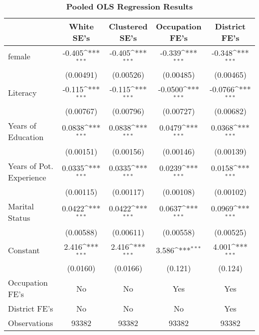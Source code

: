 \begin{table}[!htbp]\centering
\def\sym#1{\ifmmode^{#1}\else\(^{#1}\)\fi}
\caption{\textbf{Pooled OLS Regression Results}}
\small\begin{tabular}{@{\hskip\tabcolsep\extracolsep\fill}l*{4}{c}}
\toprule
                &\multicolumn{1}{c}{\textbf{White SE's}}&\multicolumn{1}{c}{\textbf{Clustered SE's}}&\multicolumn{1}{c}{\textbf{Occupation FE's}}&\multicolumn{1}{c}{\textbf{District FE's}}\\
\midrule
female          &   -0.405\sym{***}&   -0.405\sym{***}&   -0.339\sym{***}&   -0.348\sym{***}\\
                &(0.00491)         &(0.00526)         &(0.00485)         &(0.00465)         \\
\addlinespace
Literacy        &   -0.115\sym{***}&   -0.115\sym{***}&  -0.0500\sym{***}&  -0.0766\sym{***}\\
                &(0.00767)         &(0.00796)         &(0.00727)         &(0.00682)         \\
\addlinespace
Years of Education&   0.0838\sym{***}&   0.0838\sym{***}&   0.0479\sym{***}&   0.0368\sym{***}\\
                &(0.00151)         &(0.00156)         &(0.00146)         &(0.00139)         \\
\addlinespace
Years of Pot. Experience&   0.0335\sym{***}&   0.0335\sym{***}&   0.0239\sym{***}&   0.0158\sym{***}\\
                &(0.00115)         &(0.00117)         &(0.00108)         &(0.00102)         \\
\addlinespace
Marital Status  &   0.0422\sym{***}&   0.0422\sym{***}&   0.0637\sym{***}&   0.0969\sym{***}\\
                &(0.00588)         &(0.00611)         &(0.00558)         &(0.00525)         \\
\addlinespace
Constant        &    2.416\sym{***}&    2.416\sym{***}&    3.586\sym{***}&    4.001\sym{***}\\
                & (0.0160)         & (0.0166)         &  (0.121)         &  (0.124)         \\
\addlinespace
Occupation FE's &       No         &       No         &      Yes         &      Yes         \\
\addlinespace
District FE's   &       No         &       No         &       No         &      Yes         \\
\midrule
Observations    &    93382         &    93382         &    93382         &    93382         \\

\end{tabular}
\end{table}
